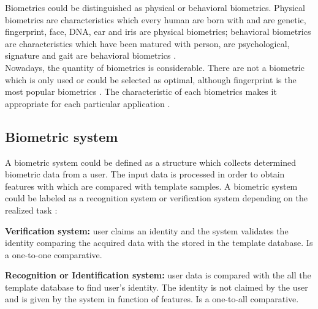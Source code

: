 Biometrics could be distinguished as physical or behavioral biometrics. Physical biometrics are characteristics which every human are born with and are genetic, fingerprint, face, DNA, ear and iris are physical biometrics; behavioral biometrics are characteristics which have been matured with person, are  psychological, signature and gait are behavioral biometrics \cite{biometrics_beha}.\\

Nowadays, the quantity of biometrics is considerable. There are not a biometric which is only used or could be selected as optimal, although fingerprint is the most popular biometrics \cite{2d_3d_face}. The characteristic of each biometrics makes it appropriate for each particular application \cite{Intro_biometrics}.\\%



\subsection{Biometric system}
A biometric system could be defined as a structure which collects determined biometric data from a user. The input data is processed in order to obtain features with which are compared with template samples. A biometric system could be labeled as a recognition system or verification system depending on the realized task \cite{Intro_biometrics2}:
\begin{description}[itemsep=2pt,topsep=8pt,parsep=0pt,partopsep=20pt]
\item \textbf{Verification system:} user claims an identity and the system validates the identity comparing the acquired data with the stored in the template database. Is a one-to-one comparative.
\item \textbf{Recognition or Identification system:} user data is compared with the all the template database to find user's identity. The identity is not claimed by the user and is given by the system in function of features. Is a one-to-all comparative.
\end{description}

